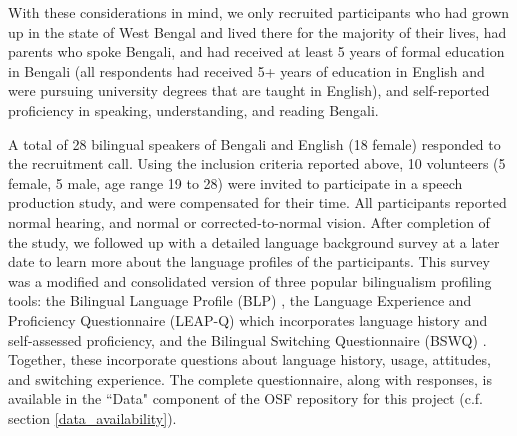 \documentclass[12 pt]{article}
\begin{document}
With these considerations in mind, we only recruited participants who had grown up in the state of West Bengal and lived there for the majority of their lives, had parents who spoke Bengali, and had received at least 5 years of formal education in Bengali (all respondents had received 5+ years of education in English and were pursuing university degrees that are taught in English), and self-reported proficiency in speaking, understanding, and reading Bengali. 
   
A total of 28 bilingual speakers of Bengali and English (18 female) responded to the recruitment call. Using the inclusion criteria reported above, 10 volunteers (5 female, 5 male, age range 19 to 28) were invited to participate in a speech production study, and were compensated for their time. All participants reported normal hearing, and normal or corrected-to-normal vision. After completion of the study, we followed up with a detailed language background survey at a later date to learn more about the language profiles of the participants. This survey was a modified and consolidated version of three popular bilingualism profiling tools: the Bilingual Language Profile (BLP) \citep{blp}, the Language Experience and Proficiency Questionnaire (LEAP-Q) \citep{leap-q} which incorporates language history and self-assessed proficiency, and the Bilingual Switching Questionnaire (BSWQ) \citep{language_switching_questionnaire}. Together, these incorporate questions about language history, usage, attitudes, and switching experience. The complete questionnaire, along with responses, is available in the ``Data" component of the OSF repository for this project (c.f. section \ref{data_availability}). 
\end{document}
